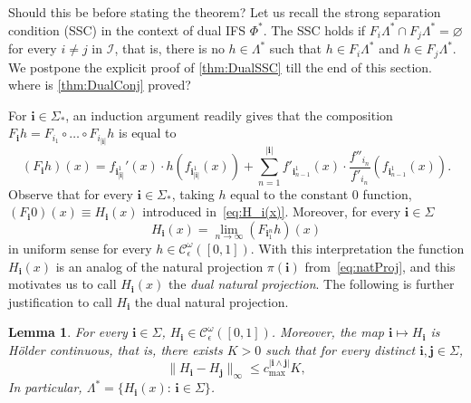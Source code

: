 \documentclass[12pt,]{article}
\def\cref#1{\ref{#1}}%
\newtheorem{lemma}[theorem]{Lemma}
\theoremstyle{definition}
\theoremstyle{remark}
\newcommand{\0}{\mathbf{0}}
\newcommand{\bi}{\mathbf{i}}
\newcommand{\bj}{\mathbf{j}}
\begin{document}
{\color{red} Should this be before stating the theorem?} Let us recall the strong separation condition (SSC) in the context of dual IFS $\Phi^*$. The SSC holds if $F_i\Lambda^*\cap F_j\Lambda^*=\varnothing$ for every $i\neq j$ in $\mathcal{I}$, that is, there is no $h\in\Lambda^*$ such that $h\in F_i\Lambda^*$ and $h\in F_j\Lambda^*$. We postpone the explicit proof of \cref{thm:DualSSC} till the end of this section. {\color{red} where is \cref{thm:DualConj} proved?}

For $\bi\in\Sigma_*$, an induction argument readily gives that the composition
$F_{\bi}h=F_{i_1}\circ\ldots\circ F_{i_{|\bi|}}h$ is equal to
\begin{equation*}%
	(F_{\bi}h)(x) = f_{\bi_{|\bi|}^1}'(x)\cdot h(f_{\bi_{|\bi|}^1}(x)) + \sum_{n=1}^{|\bi|}
	f'_{\bi_{n-1}^1}(x) \cdot 
	\frac{f''_{i_n}}{f'_{i_n}}(f_{\bi_{n-1}^1}(x)).
\end{equation*}
Observe that for every $\bi\in\Sigma_*$, taking $h$ equal to the constant $0$ function, $(F_{\bi}0)(x)\equiv H_{\bi}(x)$ introduced
in~\cref{eq:H_i(x)}. Moreover, for every $\bi\in\Sigma$
\begin{equation*}%
	H_{\bi}(x)=\lim_{n\to\infty}(F_{\bi_1^n}h)(x)
\end{equation*}
in uniform sense for every $h\in\mathcal{C}_\epsilon^\omega([0,1])$. With this interpretation the function $H_{\bi}(x)$ is an analog of the natural projection $\pi(\bi)$ from~\cref{eq:natProj}, and this motivates us to call $H_{\bi}(x)$ the \emph{dual natural projection}. The following is further justification to call $H_{\bi}$ the dual natural projection.
\begin{lemma}\label{thm:H_iAnalytic}
	For every $\bi\in\Sigma$, $H_{\bi}\in\mathcal{C}_\epsilon^{\omega}([0,1])$. Moreover, the map $\bi\mapsto H_{\bi}$ is H\"older continuous, that is, there exists $K>0$ such that for every distinct $\bi,\bj\in\Sigma$,
	\begin{equation*}%
		\|H_{\bi}-H_{\bj}\|_\infty\leq c_{\max}^{|\bi\wedge\bj|}K,
	\end{equation*}
	In particular, $\Lambda^*=\{H_{\bi}(x):\, \bi\in\Sigma\}$.
\end{lemma}
\end{document}
